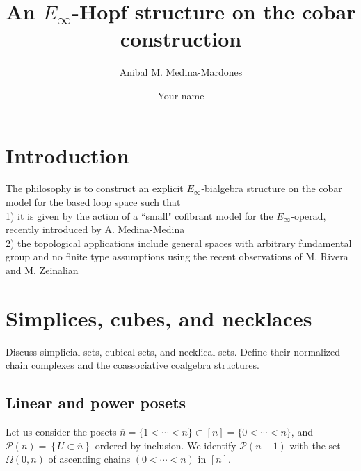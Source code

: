 \documentclass{amsart}
\renewcommand{\P}{\mathcal{P}}
\begin{document}
\title{An $E_\infty$-Hopf structure on the cobar construction}
\author{Anibal M. Medina-Mardones}
\address{Max Plank Institute for Mathematics, Bonn, Germany}
\address{Department of Mathematics, University of Notre Dame, Notre Dame, IN, USA}
\author{Your name}
\address{Your address}


\begin{abstract}
	
\end{abstract} 

\vspace*{-1cm}

\maketitle

\section{Introduction}
The philosophy is to construct an explicit $E_{\infty}$-bialgebra structure on the cobar model for the based loop space such that
\\
1) it is given by the action of a ``small" cofibrant model for the $E_{\infty}$-operad, recently introduced by A. Medina-Medina
\\
2) the topological applications include general spaces with arbitrary fundamental group and no finite type assumptions using the recent observations of M. Rivera and M. Zeinalian 

\section{Simplices, cubes, and necklaces}

Discuss simplicial sets, cubical sets, and necklical sets. Define their normalized chain complexes and the coassociative coalgebra structures.

\subsection{Linear and power posets}

Let us consider the posets $\overline{n} = \{1 < \cdots < n\} \subset [n] = \{0 < \cdots < n\}$, and $\P(n) = \left\{U \subset \overline{n}\right\}$ ordered by inclusion. We identify $\P(n-1)$ with the set $\Omega(0, n)$ of ascending chains $(0 < \cdots < n)$ in $[n]$.
\end{document}
